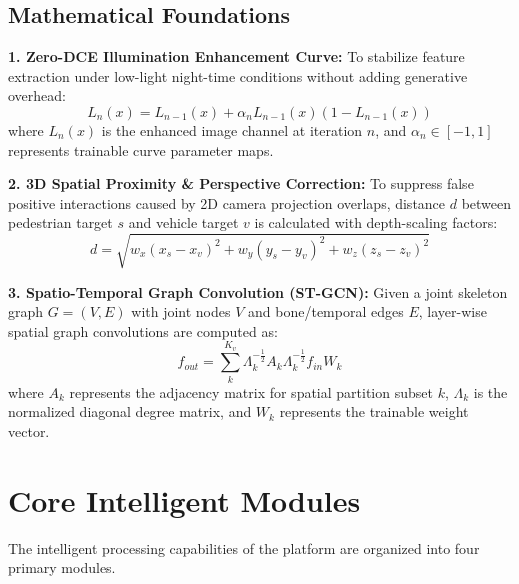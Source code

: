 \documentclass[11pt, a4paper]{article}
\begin{document}
\subsection{Mathematical Foundations}

\textbf{1. Zero-DCE Illumination Enhancement Curve:}
To stabilize feature extraction under low-light night-time conditions without adding generative overhead:
\begin{equation}
L_n(x) = L_{n-1}(x) + \alpha_n L_{n-1}(x)(1 - L_{n-1}(x))
\end{equation}
where $L_n(x)$ is the enhanced image channel at iteration $n$, and $\alpha_n \in [-1, 1]$ represents trainable curve parameter maps.

\textbf{2. 3D Spatial Proximity & Perspective Correction:}
To suppress false positive interactions caused by 2D camera projection overlaps, distance $d$ between pedestrian target $s$ and vehicle target $v$ is calculated with depth-scaling factors:
\begin{equation}
d = \sqrt{w_x(x_s - x_v)^2 + w_y(y_s - y_v)^2 + w_z(z_s - z_v)^2}
\end{equation}

\textbf{3. Spatio-Temporal Graph Convolution (ST-GCN):}
Given a joint skeleton graph $G = (V, E)$ with joint nodes $V$ and bone/temporal edges $E$, layer-wise spatial graph convolutions are computed as:
\begin{equation}
f_{out} = \sum_{k}^{K_v} \Lambda_k^{-\frac{1}{2}} A_k \Lambda_k^{-\frac{1}{2}} f_{in} W_k
\end{equation}
where $A_k$ represents the adjacency matrix for spatial partition subset $k$, $\Lambda_k$ is the normalized diagonal degree matrix, and $W_k$ represents the trainable weight vector.

\section{Core Intelligent Modules}

The intelligent processing capabilities of the platform are organized into four primary modules.
\end{document}
